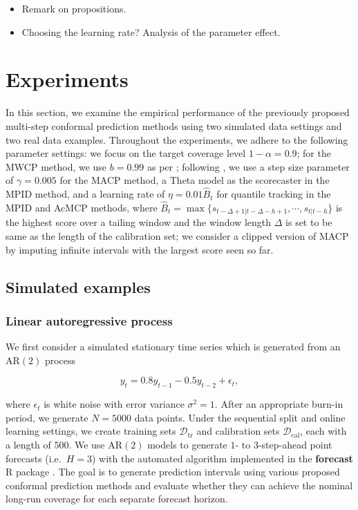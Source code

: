 \documentclass[
  11pt,
  a4paper,
]{article}
\theoremstyle{plain}
\theoremstyle{plain}
\theoremstyle{remark}
\begin{document}
\begin{itemize}
\item
  Remark on propositions.
\item
  Choosing the learning rate? Analysis of the parameter effect.
\end{itemize}

\section{Experiments}\label{experiments}

In this section, we examine the empirical performance of the previously
proposed multi-step conformal prediction methods using two simulated
data settings and two real data examples. Throughout the experiments, we
adhere to the following parameter settings: we focus on the target
coverage level \(1-\alpha=0.9\); for the MWCP method, we use \(b=0.99\)
as per \textcite{barber2023}; following \textcite{angelopoulos2024}, we
use a step size parameter of \(\gamma=0.005\) for the MACP method, a
Theta model as the scorecaster in the MPID method, and a learning rate
of \(\eta=0.01\hat{B}_t\) for quantile tracking in the MPID and AcMCP
methods, where
\(\hat{B}_t=\max\{s_{t-\Delta+1|t-\Delta-h+1},\cdots,s_{t|t-h}\}\) is
the highest score over a tailing window and the window length \(\Delta\)
is set to be same as the length of the calibration set; we consider a
clipped version of MACP by imputing infinite intervals with the largest
score seen so far.

\subsection{Simulated examples}\label{simulated-examples}

\subsubsection{Linear autoregressive
process}\label{linear-autoregressive-process}

We first consider a simulated stationary time series which is generated
from an AR\((2)\) process

\[
y_t = 0.8y_{t-1} - 0.5y_{t-2} + \epsilon_t,
\]

where \(\epsilon_t\) is white noise with error variance
\(\sigma^2 = 1\). After an appropriate burn-in period, we generate
\(N=5000\) data points. Under the sequential split and online learning
settings, we create training sets \(\mathcal{D}_{\text{tr}}\) and
calibration sets \(\mathcal{D}_{\text{cal}}\), each with a length of
\(500\). We use AR\((2)\) models to generate \(1\)- to \(3\)-step-ahead
point forecasts (i.e.~\(H=3\)) with the automated algorithm implemented
in the \textbf{forecast} R package \autocite{hyndman2024}. The goal is
to generate prediction intervals using various proposed conformal
prediction methods and evaluate whether they can achieve the nominal
long-run coverage for each separate forecast horizon.
\end{document}

